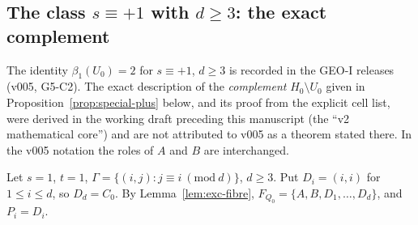 \subsection{\texorpdfstring{The class $s\equiv+1$ with $d\ge3$: the exact complement}{The class s = +1 with d >= 3: the exact complement}}

\begin{remark}\label{rem:s1-source}
The identity $\beta_1(U_0)=2$ for $s\equiv+1$, $d\ge3$ is recorded in the GEO-I releases (v005, G5-C2). The exact description of the \emph{complement} $H_0\setminus U_0$ given in Proposition~\ref{prop:special-plus} below, and its proof from the explicit cell list, were derived in the working draft preceding this manuscript (the ``v2 mathematical core'') and are not attributed to v005 as a theorem stated there. In the v005 notation the roles of $A$ and $B$ are interchanged.
\end{remark}

Let $s=1$, $t=1$, $\Gamma=\{(i,j):j\equiv i\ (\mathrm{mod}\ d)\}$, $d\ge3$. Put $D_i=(i,i)$ for $1\le i\le d$, so $D_d=C_0$. By Lemma~\ref{lem:exc-fibre}, $F_{Q_0}=\{A,B,D_1,\dots,D_d\}$, and $P_i=D_i$.

